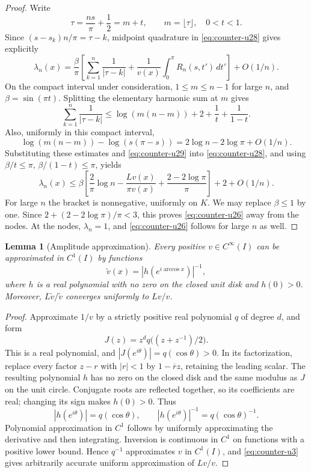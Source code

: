 \documentclass[11pt]{article}
\newtheorem{lemma}[theorem]{Lemma}
\theoremstyle{remark}
\numberwithin{equation}{section}
\begin{document}
\begin{proof}
Write
\[
 \tau=\frac{ns}{\pi}+\frac12=m+t,\qquad m=\lfloor\tau\rfloor,
 \quad0<t<1.
\]
Since \((s-s_k)n/\pi=\tau-k\), midpoint quadrature in \eqref{eq:counter-u28} gives explicitly
\[
 \lambda_n(x)=\frac \beta\pi\left[
 \sum_{k=1}^n\frac1{|\tau-k|}
 +\frac1{v(x)}\int_0^\pi R_n(s,t')\,dt'\right]+O(1/n).
\]
On the compact interval under consideration, \(1\le m\le n-1\) for large \(n\), and \(\beta=\sin(\pi t)\). Splitting the elementary harmonic sum at \(m\) gives
\[
 \sum_{k=1}^n\frac1{|\tau-k|}
 \le \log(m(n-m))+2+\frac1t+\frac1{1-t}.
\]
Also, uniformly in this compact interval,
\[
 \log(m(n-m))-\log(s(\pi-s))
 =2\log n-2\log\pi+O(1/n).
\]
Substituting these estimates and \eqref{eq:counter-u29} into \eqref{eq:counter-u28}, and using
\(\beta/t\le\pi\), \(\beta/(1-t)\le\pi\), yields
\[
 \lambda_n(x)\le
 \beta\left[\frac2\pi\log n-\frac{Lv(x)}{\pi v(x)}
                  +\frac{2-2\log\pi}{\pi}\right]+2+O(1/n).
\]
For large \(n\) the bracket is nonnegative, uniformly on \(K\). We may replace \(\beta\le1\) by one. Since
\(2+(2-2\log\pi)/\pi<3\), this proves \eqref{eq:counter-u26} away from the nodes. At the nodes, \(\lambda_n=1\), and \eqref{eq:counter-u26} follows for large \(n\) as well. \end{proof}

\begin{lemma}[Amplitude approximation]\label{lem:amplitude-approximation}
Every positive \(v\in C^\infty(I)\) can be approximated in \(C^1(I)\)
by functions
\[
 \widetilde v(x)=|h(e^{i\arccos x})|^{-1},
\]
where \(h\) is a real polynomial with no zero on the closed unit disk
and \(h(0)>0\). Moreover, \(L\widetilde v/\widetilde v\) converges
uniformly to \(Lv/v\).
\end{lemma}

\begin{proof}
Approximate \(1/v\)
by a strictly positive real polynomial \(q\) of degree \(d\), and form
\[
 J(z)=z^d q\bigl((z+z^{-1})/2\bigr).
\]
This is a real polynomial, and \(|J(e^{i\theta})|=q(\cos\theta)>0\).
In its factorization, replace every factor \(z-r\) with \(|r|<1\)
by \(1-\overline r z\), retaining the leading scalar. The resulting
polynomial \(h\) has no zero on the closed disk and the same modulus
as \(J\) on the unit circle. Conjugate roots are reflected together,
so its coefficients are real; changing its sign makes \(h(0)>0\).
Thus
\[
 |h(e^{i\theta})|=q(\cos\theta),\qquad
 |h(e^{i\theta})|^{-1}=q(\cos\theta)^{-1}.
\]
Polynomial approximation in \(C^1\) follows by uniformly approximating
the derivative and then integrating. Inversion is continuous in \(C^1\)
on functions with a positive lower bound. Hence \(q^{-1}\) approximates
\(v\) in \(C^1(I)\), and \eqref{eq:counter-u3} gives arbitrarily accurate
uniform approximation of \(Lv/v\).
\end{proof}
\end{document}
